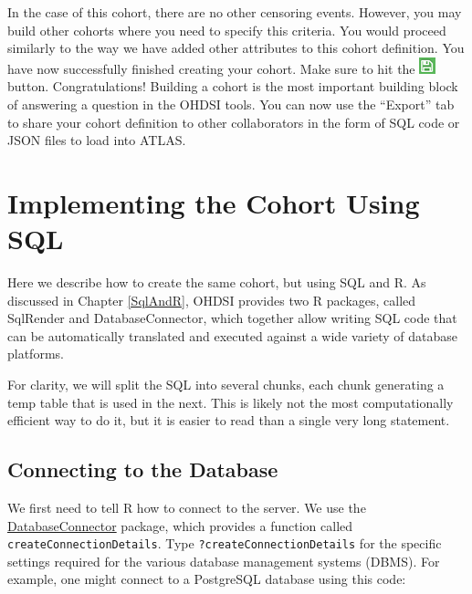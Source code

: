 \documentclass[11pt]{book}
\theoremstyle{definition}
\theoremstyle{definition}
\theoremstyle{definition}
\theoremstyle{remark}
\begin{document}
In the case of this cohort, there are no other censoring events.
However, you may build other cohorts where you need to specify this
criteria. You would proceed similarly to the way we have added other
attributes to this cohort definition. You have now successfully finished
creating your cohort. Make sure to hit the
\includegraphics{images/Cohorts/save.png} button. Congratulations!
Building a cohort is the most important building block of answering a
question in the OHDSI tools. You can now use the ``Export'' tab to share
your cohort definition to other collaborators in the form of SQL code or
JSON files to load into ATLAS.

\section{Implementing the Cohort Using
SQL}\label{implementing-the-cohort-using-sql}

Here we describe how to create the same cohort, but using SQL and R. As
discussed in Chapter \ref{SqlAndR}, OHDSI provides two R packages,
called SqlRender and DatabaseConnector, which together allow writing SQL
code that can be automatically translated and executed against a wide
variety of database platforms.

For clarity, we will split the SQL into several chunks, each chunk
generating a temp table that is used in the next. This is likely not the
most computationally efficient way to do it, but it is easier to read
than a single very long statement.

\subsection{Connecting to the
Database}\label{connecting-to-the-database}

We first need to tell R how to connect to the server. We use the
\href{https://ohdsi.github.io/DatabaseConnector/}{DatabaseConnector}
package, which provides a function called
\texttt{createConnectionDetails}. Type \texttt{?createConnectionDetails}
for the specific settings required for the various database management
systems (DBMS). For example, one might connect to a PostgreSQL database
using this code:
\end{document}
